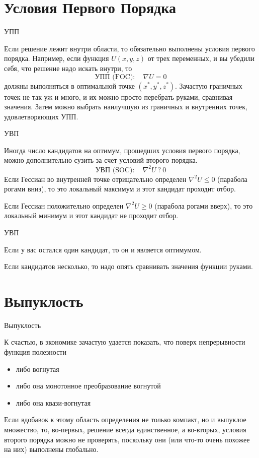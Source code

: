 \documentclass{beamer}
\begin{document}
\section{Условия Первого Порядка}

\begin{frame}{УПП}

Если решение лежит внутри области, то обязательно выполнены условия первого порядка. Например, если функция $U(x, y, z)$ от трех переменных, и вы убедили себя, что решение надо искать внутри, то
$$\text{УПП (FOC)}: \quad  \nabla U = 0$$ 
должны выполняться в оптимальной точке $(x^{\ast}, y^{\ast}, z^{\ast})$. Зачастую граничных точек не так уж и много, и их можно просто перебрать руками, сравнивая значения. Затем можно выбрать наилучшую из граничных и внутренних точек, удовлетворяющих УПП.

\end{frame}

\begin{frame}{УВП}

Иногда число кандидатов на оптимум, прошедших условия первого порядка,  можно дополнительно сузить за счет условий второго порядка.
$$\text{УВП (SOC)}: \quad  \nabla^2 U \ ? \ 0$$
Если Гессиан во внутренней точке отрицательно определен $\nabla^2 U \leqslant 0$ (парабола рогами вниз), то это локальный максимум и этот кандидат проходит отбор. 

Если Гессиан положительно определен $\nabla^2 U \geqslant 0$ (парабола рогами вверх), то это локальный минимум и этот кандидат не проходит отбор.

\end{frame}

\begin{frame}{УВП}

Если у вас остался один кандидат, то он и является оптимумом. 

Если кандидатов несколько, то надо опять сравнивать значения функции руками.

\end{frame}

\section{Выпуклость}

\begin{frame}{Выпуклость}

К счастью, в экономике зачастую удается показать, что поверх непрерывности функция полезности

\begin{itemize}
\item либо вогнутая
\item либо она монотонное преобразование вогнутой
\item либо она квази-вогнутая
\end{itemize}

Если вдобавок к этому область определения не только компакт, но и выпуклое множество, то, во-первых, решение всегда единственное, а во-вторых, условия второго порядка можно не проверять, поскольку они (или что-то очень похожее на них) выполнены глобально.

\end{frame}
\end{document}
